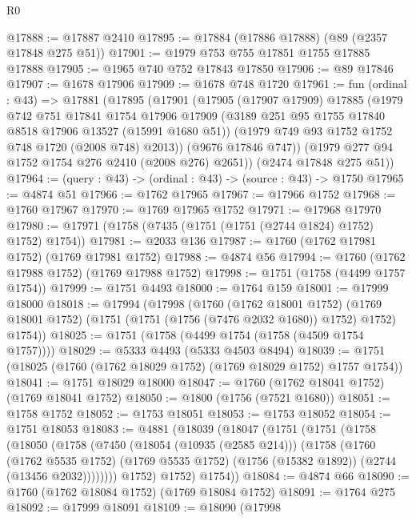\begin{lexlean}{R0}
\begin{coremodule}
@17888 := @17887 @2410
@17895 := @17884 (@17886 @17888) (@89 (@2357 @17848 @275 @51))
@17901 := @1979 @753 @755 @17851 @1755 @17885 @17888
@17905 := @1965 @740 @752 @17843 @17850
@17906 := @89 @17846
@17907 := @1678 @17906
@17909 := @1678 @748 @1720
@17961 := fun (ordinal : @43) =>
  @17881
    (@17895
      (@17901
        (@17905
          (@17907 @17909)
          @17885
          (@1979
            @742
            @751
            @17841
            @1754
            @17906
            @17909
            (@3189 @251 @95 @1755 @17840 @8518 @17906 @13527 (@15991 @1680 @51))
            (@1979 @749 @93 @1752 @1752 @748 @1720 (@2008 @748) @2013))
          (@9676 @17846 @747))
        (@1979 @277 @94 @1752 @1754 @276 @2410 (@2008 @276) @2651))
      (@2474 @17848 @275 @51))
@17964 := (query : @43) -> (ordinal : @43) -> (source : @43) -> @1750
@17965 := @4874 @51
@17966 := @1762 @17965
@17967 := @17966 @1752
@17968 := @1760 @17967
@17970 := @1769 @17965 @1752
@17971 := @17968 @17970
@17980 := @17971 (@1758 (@7435 (@1751 (@1751 (@2744 @1824) @1752) @1752) @1754))
@17981 := @2033 @136
@17987 := @1760 (@1762 @17981 @1752) (@1769 @17981 @1752)
@17988 := @4874 @56
@17994 := @1760 (@1762 @17988 @1752) (@1769 @17988 @1752)
@17998 := @1751 (@1758 (@4499 @1757 @1754))
@17999 := @1751 @4493
@18000 := @1764 @159
@18001 := @17999 @18000
@18018 := @17994
    (@17998
      (@1760
        (@1762 @18001 @1752)
        (@1769 @18001 @1752)
        (@1751 (@1751 (@1756 (@7476 @2032 @1680)) @1752) @1752)
        @1754))
@18025 := @1751 (@1758 (@4499 @1754 (@1758 (@4509 @1754 @1757))))
@18029 := @5333 @4493 (@5333 @4503 @8494)
@18039 := @1751 (@18025 (@1760 (@1762 @18029 @1752) (@1769 @18029 @1752) @1757 @1754))
@18041 := @1751 @18029 @18000
@18047 := @1760 (@1762 @18041 @1752) (@1769 @18041 @1752)
@18050 := @1800 (@1756 (@7521 @1680))
@18051 := @1758 @1752
@18052 := @1753 @18051
@18053 := @1753 @18052
@18054 := @1751 @18053
@18083 := @4881
    (@18039
      (@18047
        (@1751
          (@1751
            (@1758
              (@18050
                (@1758
                  (@7450
                    (@18054 (@10935 (@2585 @214)))
                    (@1758
                      (@1760
                        (@1762 @5535 @1752)
                        (@1769 @5535 @1752)
                        (@1756 (@15382 @1892))
                        (@2744 (@13456 @2032))))))))
            @1752)
          @1752)
        @1754))
@18084 := @4874 @66
@18090 := @1760 (@1762 @18084 @1752) (@1769 @18084 @1752)
@18091 := @1764 @275
@18092 := @17999 @18091
@18109 := @18090
    (@17998

\end{coremodule}
\end{lexlean}
